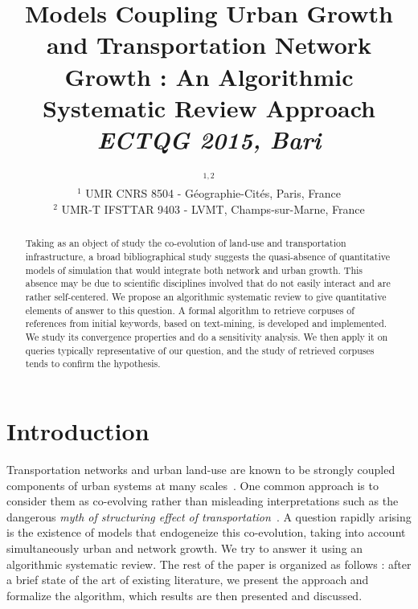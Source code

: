 


\title{Models Coupling Urban Growth and Transportation Network Growth : An Algorithmic Systematic Review Approach\\\medskip
\textit{ECTQG 2015, Bari}}
\author{$^{1,2}$\\
$^{1}$ UMR CNRS 8504 - G{\'e}ographie-Cit{\'e}s, Paris, France\\
$^{2}$ UMR-T IFSTTAR 9403 - LVMT, Champs-sur-Marne, France
}
\date{}

\maketitle

\justify

\begin{abstract}
Taking as an object of study the co-evolution of land-use and transportation infrastructure, a broad bibliographical study suggests the quasi-absence of quantitative models of simulation that would integrate both network and urban growth. This absence may be due to scientific disciplines involved that do not easily interact and are rather self-centered. We propose an algorithmic systematic review to give quantitative elements of answer to this question. A formal algorithm to retrieve corpuses of references from initial keywords, based on text-mining, is developed and implemented. We study its convergence properties and do a sensitivity analysis. We then apply it on queries typically representative of our question, and the study of retrieved corpuses tends to confirm the hypothesis.
\end{abstract}



\section{Introduction}

Transportation networks and urban land-use are known to be strongly coupled components of urban systems at many scales~\cite{bretagnolle:tel-00459720}. One common approach is to consider them as co-evolving rather than misleading interpretations such as the dangerous \emph{myth of structuring effect of transportation}~\cite{offner1993effets}. A question rapidly arising is the existence of models that endogeneize this co-evolution, taking into account simultaneously urban and network growth. We try to answer it using an algorithmic systematic review. The rest of the paper is organized as follows : after a brief state of the art of existing literature, we present the approach and formalize the algorithm, which results are then presented and discussed.

